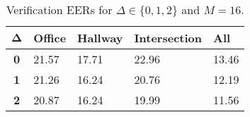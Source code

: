 \begin{table}[h]
    \centering
    \begin{tabular}{|c|M{2cm}|M{2cm}|M{2cm}|M{2cm}|}
    \hline
    $\boldsymbol{\Delta}$ & \bf{Office} & \bf{Hallway} & \bf{Intersection} & \bf{All} \\ 
    \hline 
    \hline
    \bf{0} & 21.57 & 17.71 & 22.96 & 13.46 \\
    \hline
    \bf{1} & 21.26 & 16.24 & 20.76 & 12.19 \\
    \hline
    \bf{2} & 20.87 & 16.24 & 19.99 & 11.56 \\
    \hline
    \end{tabular}
    \caption{Verification EERs for $\Delta \in \{0, 1, 2\}$ and $M = 16$.}
    \label{tab:verify_adapted_mv_M_16}
\end{table}

